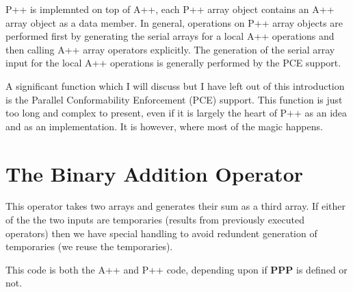 \documentclass[10pt]{llncs}
\begin{document}
   P++ is implemnted on top of A++, each P++ array object contains an A++ array object as a data member.
In general, operations on P++ array objects are performed first by generating the serial arrays for a 
local A++ operations and then calling A++ array operators explicitly.  The generation of the serial
array input for the local A++ operations is generally performed by the PCE support.

  A significant function which I will discuss but I have left out of this introduction is the
Parallel Conformability Enforcement (PCE) support.  This function is just too long and complex to
present, even if it is largely the heart of P++ as an idea and as an implementation.  It is however,
where most of the magic happens.

\section{The Binary Addition Operator}

   This operator takes two arrays and generates their sum as a third array.  If either of the
the two inputs are temporaries (results from previously executed operators) then we have special
handling to avoid redundent generation of temporaries (we reuse the temporaries).

   This code is both the A++ and P++ code, depending upon if {\bf PPP} is defined or not.

\vspace{0.5in}
\end{document}
